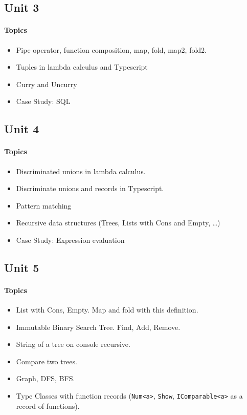 \subsection*{Unit 3}
\paragraph*{Topics}			
\begin{itemize}[noitemsep]
	\item Pipe operator, function composition, map, fold, map2, fold2.
  \item Tuples in lambda calculus and Typescript
  \item Curry and Uncurry
  \item Case Study: SQL
\end{itemize}

\subsection*{Unit 4}
\paragraph*{Topics}			
\begin{itemize}[noitemsep]
	\item Discriminated unions in lambda calculus.
  \item Discriminate unions and records in Typescript.
  \item Pattern matching
  \item Recursive data structures (Trees, Lists with Cons and Empty, …)
  \item Case Study: Expression evaluation  
\end{itemize}

\subsection*{Unit 5}
\paragraph*{Topics}
\begin{itemize}[noitemsep]
  \item List with Cons, Empty. Map and fold with this definition.
  \item Immutable Binary Search Tree. Find, Add, Remove.
  \item String of a tree on console recursive.
  \item Compare two trees.
  \item Graph, DFS, BFS.
  \item Type Classes with function records (\texttt{Num<a>}, \texttt{Show}, \texttt{IComparable<a>} as a record of functions). 
\end{itemize}

